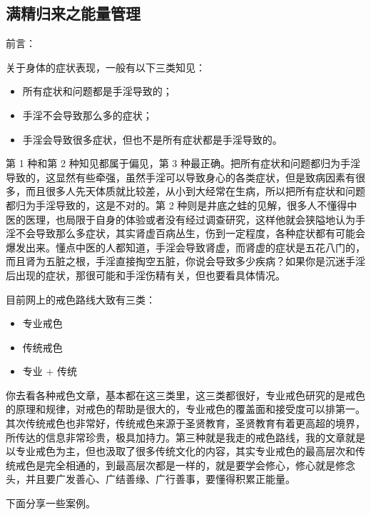 \subsection{满精归来之能量管理}

前言：

关于身体的症状表现，一般有以下三类知见：

\begin{itemize}
    \item 所有症状和问题都是手淫导致的；
    \item 手淫不会导致那么多的症状；
    \item 手淫会导致很多症状，但也不是所有症状都是手淫导致的。
\end{itemize}

第 1 种和第 2 种知见都属于偏见，第 3 种最正确。把所有症状和问题都归为手淫导致的，这显然有些牵强，虽然手淫可以导致身心的各类症状，但是致病因素有很多，而且很多人先天体质就比较差，从小到大经常在生病，所以把所有症状和问题都归为手淫导致的，这是不对的。第 2 种则是井底之蛙的见解，很多人不懂得中医的医理，也局限于自身的体验或者没有经过调查研究，这样他就会狭隘地认为手淫不会导致那么多症状，其实肾虚百病丛生，伤到一定程度，各种症状都有可能会爆发出来。懂点中医的人都知道，手淫会导致肾虚，而肾虚的症状是五花八门的，而且肾为五脏之根，手淫直接掏空五脏，你说会导致多少疾病？如果你是沉迷手淫后出现的症状，那很可能和手淫伤精有关，但也要看具体情况。

目前网上的戒色路线大致有三类：

\begin{itemize}
    \item 专业戒色
    \item 传统戒色
    \item 专业 + 传统
\end{itemize}

你去看各种戒色文章，基本都在这三类里，这三类都很好，专业戒色研究的是戒色的原理和规律，对戒色的帮助是很大的，专业戒色的覆盖面和接受度可以排第一。其次传统戒色也非常好，传统戒色来源于圣贤教育，圣贤教育有着更高超的境界，所传达的信息非常珍贵，极具加持力。第三种就是我走的戒色路线，我的文章就是以专业戒色为主，但也汲取了很多传统文化的内容，其实专业戒色的最高层次和传统戒色是完全相通的，到最高层次都是一样的，就是要学会修心，修心就是修念头，并且要广发善心、广结善缘、广行善事，要懂得积累正能量。

下面分享一些案例。

